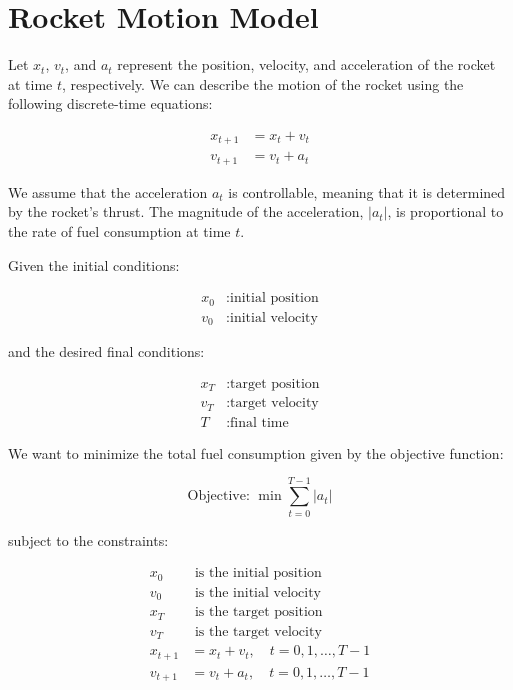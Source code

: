 \documentclass{article}
\begin{document}
\section*{Rocket Motion Model}

Let \( x_t \), \( v_t \), and \( a_t \) represent the position, velocity, and acceleration of the rocket at time \( t \), respectively. We can describe the motion of the rocket using the following discrete-time equations:

\begin{align}
    x_{t+1} &= x_t + v_t \\
    v_{t+1} &= v_t + a_t
\end{align}

We assume that the acceleration \( a_t \) is controllable, meaning that it is determined by the rocket's thrust. The magnitude of the acceleration, \( |a_t| \), is proportional to the rate of fuel consumption at time \( t \).

Given the initial conditions:

\begin{align*}
    x_0 &: \text{initial position} \\
    v_0 &: \text{initial velocity}
\end{align*}

and the desired final conditions:

\begin{align*}
    x_T &: \text{target position} \\
    v_T &: \text{target velocity} \\
    T &: \text{final time}
\end{align*}

We want to minimize the total fuel consumption given by the objective function:

\[
\text{Objective: } \min \sum_{t=0}^{T-1} |a_t|
\]

subject to the constraints:

\begin{align}
    x_0 & \text{ is the initial position} \\
    v_0 & \text{ is the initial velocity} \\
    x_T & \text{ is the target position} \\
    v_T & \text{ is the target velocity} \\
    x_{t+1} &= x_t + v_t, \quad t = 0, 1, \ldots, T-1 \\
    v_{t+1} &= v_t + a_t, \quad t = 0, 1, \ldots, T-1
\end{align}
\end{document}
